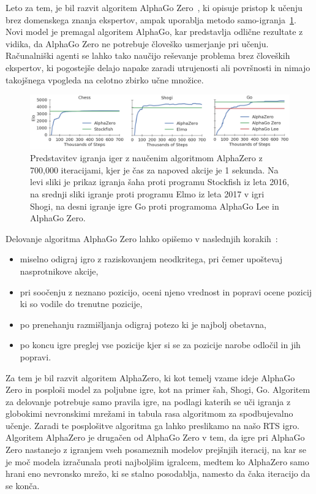 \documentclass[a4paper, 12pt]{book}
\begin{document}
Leto za tem, je bil razvit algoritem AlphaGo Zero~\cite{silver2017mastering}, ki opisuje pristop k učenju brez domenskega znanja ekspertov, ampak uporablja metodo samo-igranja~\ref{picCompareGo}. 
Novi model je premagal algoritem AlphaGo, kar predstavlja odlične rezultate z vidika, da AlphaGo Zero ne potrebuje človeško usmerjanje pri učenju.
Računalniški agenti se lahko tako naučijo reševanje problema brez človeških ekspertov, ki pogostejše delajo napake zaradi utrujenosti ali površnosti in nimajo takojšnega vpogleda na celotno zbirko učne množice.

\begin{figure}[h!]
	\begin{center}
		\includegraphics[width=1\textwidth]{photos/go.pdf}
	\end{center}
	\caption{Predstavitev igranja iger z naučenim algoritmom AlphaZero z 700,000 iteracijami, kjer je čas za napoved akcije je 1 sekunda. Na levi sliki je prikaz igranja šaha proti programu Stockfish iz leta 2016, na srednji sliki igranje proti programu Elmo iz leta 2017 v igri Shogi, na desni igranje igre Go proti programoma AlphaGo Lee in AlphaGo Zero. }
	\label{picCompareGo}
\end{figure}

Delovanje algoritma AlphaGo Zero lahko opišemo v naslednjih korakih~\cite{guid}:
\begin{itemize}
	\item miselno odigraj igro z raziskovanjem neodkritega, pri čemer upoštevaj nasprotnikove akcije,
	\item pri soočenju z neznano pozicijo, oceni njeno vrednost in popravi ocene pozicij ki so vodile do trenutne pozicije,
	\item po prenehanju razmišljanja odigraj potezo ki je najbolj obetavna,
	\item po koncu igre preglej vse pozicije kjer si se za pozicije narobe odločil in jih popravi.
\end{itemize}


Za tem je bil razvit algoritem AlphaZero, ki kot temelj vzame ideje AlphaGo Zero in posploši model za poljubne igre, kot na primer šah, Shogi, Go.
Algoritem za delovanje potrebuje samo pravila igre, na podlagi katerih se uči igranja z globokimi nevronskimi mrežami in tabula rasa algoritmom za spodbujevalno učenje.
Zaradi te posplošitve algoritma ga lahko preslikamo na našo RTS igro.
Algoritem AlphaZero je drugačen od AlphaGo Zero v tem, da igre pri AlphaGo Zero nastanejo z igranjem vseh posameznih modelov prejšnjih iteracij, na kar se je moč modela izračunala proti najboljšim igralcem, medtem ko AlphaZero samo hrani eno nevronsko mrežo, ki se stalno posodablja, namesto da čaka iteracijo da se konča.
\end{document}
